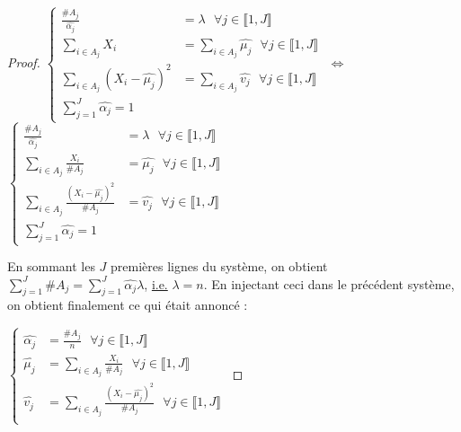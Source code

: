 \documentclass[frenchb]{report}
\newcommand{\1}{\mathbbm{1}}
\theoremstyle{definition}\newtheorem{defn}{Définition}
\theoremstyle{definition}\newtheorem{exm}{Exemple}
\theoremstyle{definition}\newtheorem{nota}{Notation}
\theoremstyle{definition}\newtheorem{rem}{Remarque}
\begin{document}
\begin{proof}
$
\begin{cases}
\displaystyle\frac{\#A_j}{\widehat{\alpha_j}} &= \lambda \text{ } \forall j \in \llbracket 1,J \rrbracket \\
\displaystyle\sum_{i\in A_j}X_i & =\displaystyle\sum_{i\in A_j} \widehat{\mu_j} \text{ } \forall j \in \llbracket 1,J \rrbracket \\
\displaystyle\sum_{i\in A_j} (X_i-\widehat{\mu_j})^2 &= \displaystyle\sum_{i\in A_j} \widehat{v_j}  \text{ } \forall j \in \llbracket 1,J \rrbracket \\
\displaystyle\sum_{j=1}^J \widehat{\alpha_j} = 1
\end{cases}
$
$\Leftrightarrow$
$
\begin{cases}
\displaystyle\frac{\#A_j}{\widehat{\alpha_j}} &= \lambda \text{ } \forall j \in \llbracket 1,J \rrbracket \\
\displaystyle\sum_{i\in A_j}\frac{X_i}{\#A_j} & = \widehat{\mu_j} \text{ } \forall j \in \llbracket 1,J \rrbracket \\
\displaystyle\sum_{i\in A_j} \frac{(X_i-\widehat{\mu_j})^2}{\#A_j} &=  \widehat{v_j}  \text{ } \forall j \in \llbracket 1,J \rrbracket \\
\displaystyle\sum_{j=1}^J \widehat{\alpha_j} = 1
\end{cases}
$

En sommant les $J$ premières lignes du système, on obtient $\displaystyle\sum_{j=1}^J\#A_j = \sum_{j=1}^J\widehat{\alpha_j}\lambda$, \underline{i.e.} $\lambda = n$. En injectant ceci dans le précédent système, on obtient finalement ce qui était annoncé :

$
\begin{cases}
\widehat{\alpha_j} &= \displaystyle \frac{\#A_j}{n} \text{ } \forall j \in \llbracket 1,J \rrbracket \\
\widehat{\mu_j} &= \displaystyle\sum_{i\in A_j}\frac{X_i}{\#A_j} \text{ } \forall j \in \llbracket 1,J \rrbracket \\
\widehat{v_j} &= \displaystyle\sum_{i\in A_j} \frac{(X_i-\widehat{\mu_j})^2}{\#A_j}  \text{ } \forall j \in \llbracket 1,J \rrbracket \\
\end{cases}
$
\end{proof}


\end{document}
